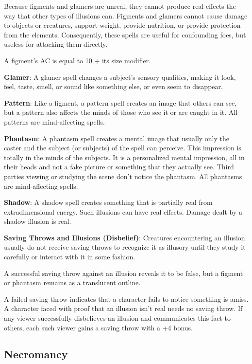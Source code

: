 Because figments and glamers are unreal, they cannot produce real effects the way that other types of illusions can. Figments and glamers cannot cause damage to objects or creatures, support weight, provide nutrition, or provide protection from the elements. Consequently, these spells are useful for confounding foes, but useless for attacking them directly. 
				
A figment's AC is equal to 10 + its size modifier.
				
\textbf{Glamer}: A glamer spell changes a subject's sensory qualities, making it look, feel, taste, smell, or sound like something else, or even seem to disappear.
				
\textbf{Pattern}: Like a figment, a pattern spell creates an image that others can see, but a pattern also affects the minds of those who see it or are caught in it. All patterns are mind-affecting spells.
				
\textbf{Phantasm}: A phantasm spell creates a mental image that usually only the caster and the subject (or subjects) of the spell can perceive. This impression is totally in the minds of the subjects. It is a personalized mental impression, all in their heads and not a fake picture or something that they actually see. Third parties viewing or studying the scene don't notice the phantasm. All phantasms are mind-affecting spells.
				
\textbf{Shadow}: A shadow spell creates something that is partially real from extradimensional energy. Such illusions can have real effects. Damage dealt by a shadow illusion is real.
				
\textbf{Saving Throws and Illusions (Disbelief)}: Creatures encountering an illusion usually do not receive saving throws to recognize it as illusory until they study it carefully or interact with it in some fashion.
				
A successful saving throw against an illusion reveals it to be false, but a figment or phantasm remains as a translucent outline.
				
A failed saving throw indicates that a character fails to notice something is amiss. A character faced with proof that an illusion isn't real needs no saving throw. If any viewer successfully disbelieves an illusion and communicates this fact to others, each such viewer gains a saving throw with a +4 bonus.
				
\subsection{Necromancy}

